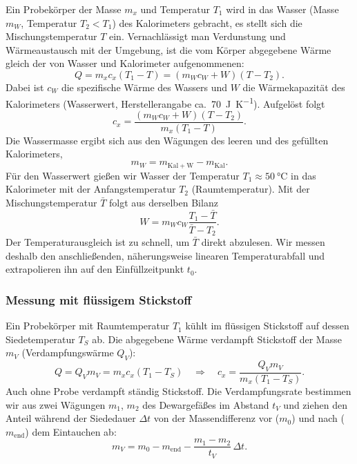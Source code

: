 \documentclass{article}
\begin{document}
Ein Probekörper der Masse $m_x$ und Temperatur $T_1$ wird in das Wasser (Masse $m_W$, Temperatur
$T_2 < T_1$) des Kalorimeters gebracht, es stellt sich die Mischungstemperatur $T$ ein.
Vernachlässigt man Verdunstung und Wärmeaustausch mit der Umgebung, ist die vom Körper abgegebene
Wärme gleich der von Wasser und Kalorimeter aufgenommenen:
\begin{equation}
	Q = m_x c_x \left(T_1 - T\right) = \left(m_W c_W + W\right)\left(T - T_2\right) .
	\label{eq:energiebilanz}
\end{equation}
Dabei ist $c_W$ die spezifische Wärme des Wassers und $W$ die Wärmekapazität des Kalorimeters
(Wasserwert, Herstellerangabe ca.~\qty{70}{\joule\per\kelvin}). Aufgelöst folgt
\begin{equation}
	c_x = \frac{\left(m_W c_W + W\right)\left(T - T_2\right)}{m_x \left(T_1 - T\right)} .
	\label{eq:cx_misch}
\end{equation}
Die Wassermasse ergibt sich aus den Wägungen des leeren und des gefüllten Kalorimeters,
\begin{equation}
	m_W = m_\mathrm{Kal+W} - m_\mathrm{Kal} .
	\label{eq:a2_mw}
\end{equation}
Für den Wasserwert gießen wir Wasser der Temperatur $T_1 \approx \qty{50}{\degreeCelsius}$ in das
Kalorimeter mit der Anfangstemperatur $T_2$ (Raumtemperatur). Mit der Mischungstemperatur $\bar{T}$
folgt aus derselben Bilanz
\begin{equation}
	W = m_W c_W \frac{T_1 - \bar{T}}{\bar{T} - T_2} .
	\label{eq:wasserwert}
\end{equation}
Der Temperaturausgleich ist zu schnell, um $\bar{T}$ direkt abzulesen. Wir messen deshalb den
anschließenden, näherungsweise linearen Temperaturabfall und extrapolieren ihn auf den
Einfüllzeitpunkt $t_0$.

\subsubsection{Messung mit flüssigem Stickstoff}
\label{sec:stickstoff}

Ein Probekörper mit Raumtemperatur $T_1$ kühlt im flüssigen Stickstoff auf dessen Siedetemperatur
$T_S$ ab. Die abgegebene Wärme verdampft Stickstoff der Masse $m_V$ (Verdampfungswärme $Q_V$):
\begin{equation}
	Q = Q_V m_V = m_x c_x \left(T_1 - T_S\right)
	\quad\Rightarrow\quad
	c_x = \frac{Q_V m_V}{m_x \left(T_1 - T_S\right)} .
	\label{eq:cx_stickstoff}
\end{equation}
Auch ohne Probe verdampft ständig Stickstoff. Die Verdampfungsrate bestimmen wir aus zwei Wägungen
$m_1$, $m_2$ des Dewargefäßes im Abstand $t_V$ und ziehen den Anteil während der Siededauer
$\Delta t$ von der Massendifferenz vor ($m_0$) und nach ($m_\mathrm{end}$) dem Eintauchen ab:
\begin{equation}
	m_V = m_0 - m_\mathrm{end} - \frac{m_1 - m_2}{t_V}\,\Delta t .
	\label{eq:mv}
\end{equation}
\end{document}
